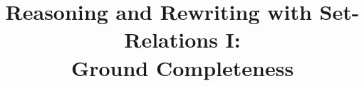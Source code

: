 \newcommand{\Seq}{\mathrel{\mapsto}}
\newcommand{\Ord}{\mathbin{\rightarrow}}
\newcommand{\M}[1]{\mathbin{\mathord{#1}^m}}
\newcommand{\Mset}[1]{{\cal M}(#1)}
\newcommand{\interpret}[1]{[\![#1]\!]^{A}_{\rho}}
\newcommand{\Interpret}[1]{[\![#1]\!]^{A}}
\newcommand{\Comp}[2]{#1\diamond#2}
\newcommand{\Repl}[2]{\mbox{\sf Repl}(#1,#2)}
\newcommand{\Sup}{\mbox{\sf Sup}}
\newcommand\SS[1]{{\cal S}^{#1}}
\newcommand{\To}[1]{\mathbin{\stackrel{#1}{\longrightarrow}}}
\newcommand{\TTo}[1]{\mathbin{\stackrel{#1}{\Longrightarrow}}}
\newcommand{\oT}[1]{\mathbin{\stackrel{#1}{\longleftarrow}}}
\newcommand{\oTT}[1]{\mathbin{\stackrel{#1}{\Longleftarrow}}}
\newcommand{\es}{\emptyset}
\newcommand{\C}[1]{\mbox{$\cal #1$}}
\newcommand{\Mb}[1]{\mbox{#1}}
\newcommand{\<}{\langle}
\renewcommand{\>}{\rangle}
\newcommand{\Def}{\mathrel{\stackrel{\mbox{\tiny def}}{=}}}
\newcommand{\impl}{\mathrel\Rightarrow}
\newcommand{\then}{\mathrel\Rightarrow}
\newcommand{\List}[3]{#1_{1}#3\ldots#3#1_{#2}}
\newcommand{\prule}[2]{{\displaystyle #1 \over \displaystyle#2}}
\newcommand{\newITEM}[1]{\gdef\ITEMlabel{ITEM:#1-}\setcounter{ITEM}{0}}
\makeatletter
\newcommand{\Not}[1]{\mathbin {\mathpalette\c@ncel#1}}
\def\l@bel#1${\edef\@currentlabel{(\roman{ITEM})}\label{#1}}
\newcommand{\ITEM}[2]{\par\addvspace{.7ex}\noindent
   \refstepcounter{ITEM}\expandafter\l@bel\ITEMlabel#1${\advance\linewidth-2em
   \hskip2em \parbox{\linewidth}{\hskip-2em {\rm\bf \@currentlabel\
   }\ignorespaces #2}}\par \addvspace{.7ex}\noindent\ignorespaces}
\def\R@f#1${\ref{#1}}
\newcommand{\?}[1]{\expandafter\R@f\ITEMlabel#1$}
\makeatother
\newcommand{\PROOFRULE}[2]{\trivlist\item[\hskip\labelsep {\bf #1}]#2\par
  \addvspace{1ex}\noindent\ignorespaces}
\newenvironment{clauses}{\begin{array}{r@{.\ \ }r@{\;\Seq\;}l}}{\end{array}}
\newcommand{\Cs}{\varepsilon}
\newcommand{\const}[3]{\Cs_{\scriptscriptstyle#2}(#1,#3)}
\newcommand{\Ein}{\sqsubset}%
\newcommand{\Eineq}{\sqsubseteq}%



\title{Reasoning and Rewriting with Set-Relations I: \\Ground Completeness}


